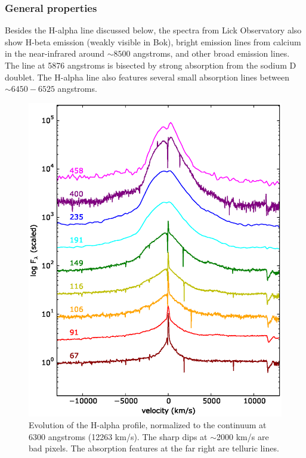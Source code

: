 \documentclass[iop]{emulateapj}
\begin{document}
\subsubsection{General properties} \label{analysis:spec:gen}
Besides the H-alpha line discussed below, the spectra from Lick Observatory also show H-beta emission (weakly visible in Bok), bright emission lines from calcium in the near-infrared around $\sim8500$ angstroms, and other broad emission lines. The line at 5876 angstroms is bisected by strong absorption from the sodium D doublet. The H-alpha line also features several small absorption lines between $\sim6450-6525$ angstroms.

\begin{figure}
  \includegraphics[width=\linewidth]{graphics/H_alpha.eps}
  \caption{Evolution of the H-alpha profile, normalized to the continuum at 6300 angstroms (12263 km/s). The sharp dips at $\sim$2000 km/s are bad pixels. The absorption features at the far right are telluric lines.}
  \label{fig:H-alpha}
\end{figure}
\end{document}
